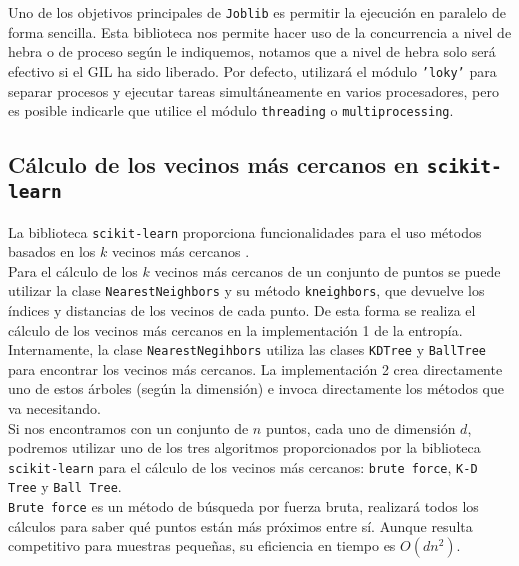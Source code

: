\documentclass[12pt,a4paper]{report} %
\theoremstyle{definition}
\begin{document}
Uno de los objetivos principales de \texttt{Joblib} \cite{joblib} es permitir la ejecución en paralelo de forma sencilla. Esta biblioteca nos permite hacer uso de la concurrencia a nivel de hebra o de proceso según le indiquemos, notamos que a nivel de hebra solo será efectivo si el GIL ha sido liberado. Por defecto, utilizará el módulo \texttt{'loky'} para separar procesos y ejecutar tareas simultáneamente en varios procesadores, pero es posible indicarle que utilice el módulo \texttt{threading} o \texttt{multiprocessing}.\\

\subsection{Cálculo de los vecinos más cercanos en \texttt{scikit-learn}}
La biblioteca \texttt{scikit-learn} proporciona funcionalidades para el uso métodos basados en los $k$ vecinos más cercanos \cite{doc_nn}.\\

Para el cálculo de los $k$ vecinos más cercanos de un conjunto de puntos se puede utilizar la clase \texttt{NearestNeighbors} \cite{nearestneighbors} y su método \texttt{kneighbors}, que devuelve los índices y distancias de los vecinos de cada punto. De esta forma se realiza el cálculo de los vecinos más cercanos en la implementación 1 de la entropía. Internamente, la clase \texttt{NearestNegihbors} utiliza las clases \texttt{KDTree} y \texttt{BallTree} para encontrar los vecinos más cercanos. La implementación 2 crea directamente uno de estos árboles (según la dimensión) e invoca directamente los métodos que va necesitando.\\

Si nos encontramos con un conjunto de $n$ puntos, cada uno de dimensión $d$, podremos utilizar uno de los tres algoritmos proporcionados por la biblioteca \texttt{scikit-learn} para el cálculo de los vecinos más cercanos: \texttt{brute force}, \texttt{K-D Tree} y \texttt{Ball Tree}.\\

\texttt{Brute force} es un método de búsqueda por fuerza bruta, realizará todos los cálculos para saber qué puntos están más próximos entre sí. Aunque resulta competitivo para muestras pequeñas, su eficiencia en tiempo es $O(dn^2)$.\\
\end{document}
